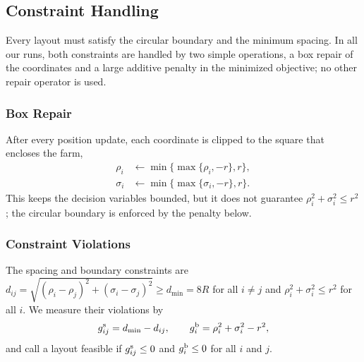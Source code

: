 \documentclass[journal,twoside]{IEEEtran}
\begin{document}
\subsection{Constraint Handling}
\label{sec:constraints}

Every layout must satisfy the circular boundary and the minimum spacing. In all our runs, both constraints are handled by two simple operations, a box repair of the coordinates and a large additive penalty in the minimized objective; no other repair operator is used.

\subsubsection{Box Repair}
After every position update, each coordinate is clipped to the square that encloses the farm,
\begin{align*}
\rho_i&\leftarrow\min\{\max\{\rho_i,-r\},r\},\\
\sigma_i&\leftarrow\min\{\max\{\sigma_i,-r\},r\}.
\end{align*}
This keeps the decision variables bounded, but it does not guarantee $\rho_i^2+\sigma_i^2\le r^2$; the circular boundary is enforced by the penalty below.

\subsubsection{Constraint Violations}
The spacing and boundary constraints are $d_{ij}=\sqrt{(\rho_i-\rho_j)^2+(\sigma_i-\sigma_j)^2}\ge d_{\min}=8R$ for all $i\ne j$ and $\rho_i^2+\sigma_i^2\le r^2$ for all $i$. We measure their violations by
\begin{equation}
g^{\rm s}_{ij}=d_{\min}-d_{ij},\qquad g^{\rm b}_{i}=\rho_i^2+\sigma_i^2-r^2,
\label{eq:spacingviolation}
\end{equation}
and call a layout feasible if $g^{\rm s}_{ij}\le0$ and $g^{\rm b}_i\le0$ for all $i$ and $j$.
\end{document}
